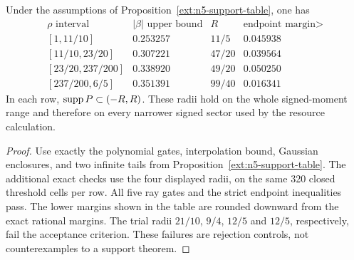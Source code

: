 \begin{corollary}
\label{ext:n5-refined-support}
Under the assumptions of Proposition~\ref{ext:n5-support-table}, one has
\[
 \begin{array}{c|c|c|c}
 \rho\text{ interval}&|\beta|\text{ upper bound}&R&
       \text{endpoint margin}>\\ \hline
 {[1,11/10]}&0.253257&11/5&0.045938\\
 {[11/10,23/20]}&0.307221&47/20&0.039564\\
 {[23/20,237/200]}&0.338920&49/20&0.050250\\
 {[237/200,6/5]}&0.351391&99/40&0.016341
 \end{array}
\]
In each row, $\operatorname{supp} P\subset(-R,R)$. These radii hold on the
whole signed-moment range and therefore on every narrower signed sector
used by the resource calculation.
\end{corollary}
\begin{proof}
Use exactly the polynomial gates, interpolation bound, Gaussian enclosures,
and two infinite tails from Proposition~\ref{ext:n5-support-table}.
The additional exact checks use the four displayed radii,
on the same 320 closed threshold cells per row. All five ray gates and
the strict endpoint inequalities pass. The lower margins shown in the
table are rounded downward from the exact rational margins. The trial radii $21/10$, $9/4$, $12/5$ and $12/5$, respectively,
fail the acceptance criterion. These failures are rejection controls,
not counterexamples to a support theorem.
\end{proof}

